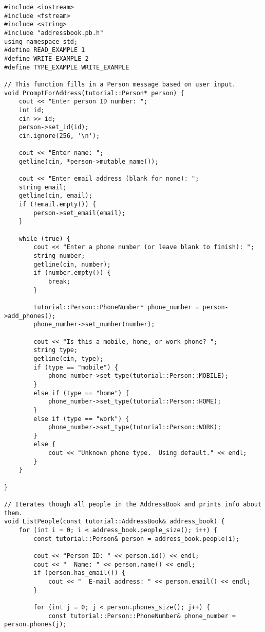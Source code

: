 \begin{lstlisting}
#include <iostream>
#include <fstream>
#include <string>
#include "addressbook.pb.h"
using namespace std;
#define READ_EXAMPLE 1
#define WRITE_EXAMPLE 2
#define TYPE_EXAMPLE WRITE_EXAMPLE

// This function fills in a Person message based on user input.
void PromptForAddress(tutorial::Person* person) {
    cout << "Enter person ID number: ";
    int id;
    cin >> id;
    person->set_id(id);
    cin.ignore(256, '\n');

    cout << "Enter name: ";
    getline(cin, *person->mutable_name());

    cout << "Enter email address (blank for none): ";
    string email;
    getline(cin, email);
    if (!email.empty()) {
        person->set_email(email);
    }

    while (true) {
        cout << "Enter a phone number (or leave blank to finish): ";
        string number;
        getline(cin, number);
        if (number.empty()) {
            break;
        }

        tutorial::Person::PhoneNumber* phone_number = person->add_phones();
        phone_number->set_number(number);

        cout << "Is this a mobile, home, or work phone? ";
        string type;
        getline(cin, type);
        if (type == "mobile") {
            phone_number->set_type(tutorial::Person::MOBILE);
        }
        else if (type == "home") {
            phone_number->set_type(tutorial::Person::HOME);
        }
        else if (type == "work") {
            phone_number->set_type(tutorial::Person::WORK);
        }
        else {
            cout << "Unknown phone type.  Using default." << endl;
        }
    }

}

// Iterates though all people in the AddressBook and prints info about them.
void ListPeople(const tutorial::AddressBook& address_book) {
    for (int i = 0; i < address_book.people_size(); i++) {
        const tutorial::Person& person = address_book.people(i);

        cout << "Person ID: " << person.id() << endl;
        cout << "  Name: " << person.name() << endl;
        if (person.has_email()) {
            cout << "  E-mail address: " << person.email() << endl;
        }

        for (int j = 0; j < person.phones_size(); j++) {
            const tutorial::Person::PhoneNumber& phone_number = person.phones(j);


\end{lstlisting}
